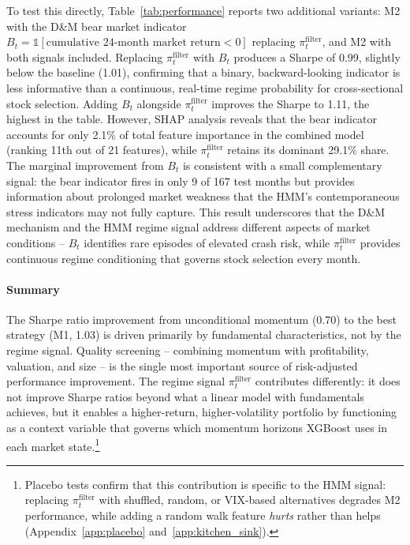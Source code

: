 To test this directly, Table~\ref{tab:performance} reports two additional variants: M2 with the D\&M bear market indicator $B_t = \mathds{1}[\text{cumulative 24-month market return} < 0]$ replacing $\pi_t^{\text{filter}}$, and M2 with both signals included. Replacing $\pi_t^{\text{filter}}$ with $B_t$ produces a Sharpe of 0.99, slightly below the baseline (1.01), confirming that a binary, backward-looking indicator is less informative than a continuous, real-time regime probability for cross-sectional stock selection. Adding $B_t$ alongside $\pi_t^{\text{filter}}$ improves the Sharpe to 1.11, the highest in the table. However, SHAP analysis reveals that the bear indicator accounts for only 2.1\% of total feature importance in the combined model (ranking 11th out of 21 features), while $\pi_t^{\text{filter}}$ retains its dominant 29.1\% share. The marginal improvement from $B_t$ is consistent with a small complementary signal: the bear indicator fires in only 9 of 167 test months but provides information about prolonged market weakness that the HMM's contemporaneous stress indicators may not fully capture. This result underscores that the D\&M mechanism and the HMM regime signal address different aspects of market conditions -- $B_t$ identifies rare episodes of elevated crash risk, while $\pi_t^{\text{filter}}$ provides continuous regime conditioning that governs stock selection every month.

\paragraph{Summary}
The Sharpe ratio improvement from unconditional momentum (0.70) to the best strategy (M1, 1.03) is driven primarily by fundamental characteristics, not by the regime signal. Quality screening -- combining momentum with profitability, valuation, and size -- is the single most important source of risk-adjusted performance improvement. The regime signal $\pi_t^{\text{filter}}$ contributes differently: it does not improve Sharpe ratios beyond what a linear model with fundamentals achieves, but it enables a higher-return, higher-volatility portfolio by functioning as a context variable that governs which momentum horizons XGBoost uses in each market state.\footnote{Placebo tests confirm that this contribution is specific to the HMM signal: replacing $\pi_t^{\text{filter}}$ with shuffled, random, or VIX-based alternatives degrades M2 performance, while adding a random walk feature \emph{hurts} rather than helps (Appendix~\ref{app:placebo} and~\ref{app:kitchen_sink}).}

